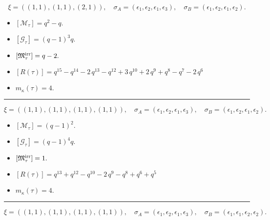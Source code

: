 \documentclass[10pt,a4paper]{amsart}
\begin{document}
$$\xi = ({(1, 1), (1, 1)}, {(2, 1)}),\quad \sigma_A = ({{\epsilon_1}, {\epsilon_2}}, {{\epsilon_1, \epsilon_3}}),\quad \sigma_B = ({{\epsilon_1}, {\epsilon_2}}, {{\epsilon_1, \epsilon_2}}).$$

\begin{itemize}
 \item $[\mathcal{M}_{\tau}] = q^{2} - q .$

 \item $[\mathcal{G}_{\tau}] = {\left(q - 1\right)}^{3} q .$

 \item $[{\frak M}_{\tau}^{\textrm{irr}}] = q - 2 .$

 \item $[R(\tau)] = q^{15} - q^{14} - 2 \, q^{13} - q^{12} + 3 \, q^{10} + 2 \, q^{9} + q^{8} - q^{7} - 2 \, q^{6} $

 \item $m_{\kappa}(\tau) = 4 .$

 \end{itemize}
\noindent\rule{8cm}{0.4pt}

$$\xi = ({(1, 1), (1, 1)}, {(1, 1), (1, 1)}),\quad \sigma_A = ({{\epsilon_1}, {\epsilon_2}}, {{\epsilon_1}, {\epsilon_3}}),\quad \sigma_B = ({{\epsilon_1}, {\epsilon_2}}, {{\epsilon_1}, {\epsilon_2}}).$$

\begin{itemize}
 \item $[\mathcal{M}_{\tau}] = {\left(q - 1\right)}^{2} .$

 \item $[\mathcal{G}_{\tau}] = {\left(q - 1\right)}^{4} q .$

 \item $[{\frak M}_{\tau}^{\textrm{irr}}] = 1 .$

 \item $[R(\tau)] = q^{13} + q^{12} - q^{10} - 2 \, q^{9} - q^{8} + q^{6} + q^{5} $

 \item $m_{\kappa}(\tau) = 4 .$

 \end{itemize}
\noindent\rule{8cm}{0.4pt}

$$\xi = ({(1, 1), (1, 1)}, {(1, 1), (1, 1)}),\quad \sigma_A = ({{\epsilon_1}, {\epsilon_2}}, {{\epsilon_1}, {\epsilon_3}}),\quad \sigma_B = ({{\epsilon_1}, {\epsilon_1}}, {{\epsilon_2}, {\epsilon_2}}).$$
\end{document}
